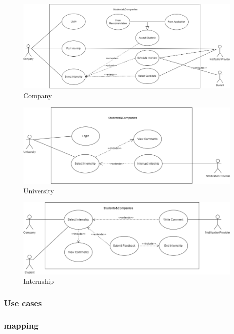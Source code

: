 \documentclass{article}
\begin{document}
\begin{figure}[H]
    \centering
    \includegraphics[scale = 0.4]{figures/Company.drawio.png}
    \caption{Company}
    \centering
\end{figure}
\begin{figure}[H]
    \centering
    \includegraphics[scale = 0.45]{figures/use_case_1-University.drawio.png}
    \caption{University}
    \centering
\end{figure}
\begin{figure}[H]
    \centering
    \includegraphics[scale = 0.45]{figures/use_case_1-Student - Company.drawio.png}
    \caption{Internship}
    \centering
\end{figure}
\subsubsection{Use cases}
\subsubsection{mapping}
\end{document}

